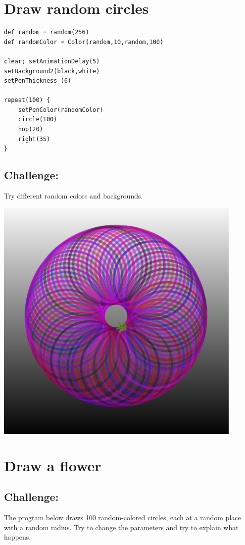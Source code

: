 \chapter{Draw random circles}
\begin{multicols}{2}

\begin{lstlisting}[basicstyle={\ttfamily\fontsize{16}{19}\selectfont},numbers=none]
def random = random(256)
def randomColor = Color(random,10,random,100) 

clear; setAnimationDelay(5)
setBackground2(black,white)
setPenThickness (6)

repeat(100) {
    setPenColor(randomColor)
    circle(100)
    hop(20)
    right(35)
}
\end{lstlisting}
        
\section*{\color{BrickRed}Challenge:}
Try different random colors and backgrounds.


\columnbreak


\begin{center}
\includegraphics[width=12.0cm]{../img/circle-of-circles.png}
\end{center}

\end{multicols}

\chapter{Draw a flower}\section*{\color{BrickRed}Challenge:}
The program below draws 100 random-colored circles, each at a random place with a random radius. Try to change the parameters and try to explain what happens.

